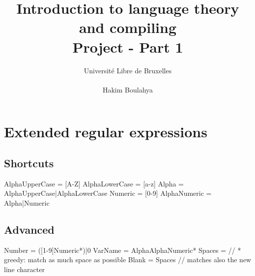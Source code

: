 \documentclass[letterpaper]{article}
\title{Introduction to language theory and compiling
\\ Project - Part 1}
\author{Université Libre de Bruxelles \\
\\ Hakim Boulahya}
\begin{document}
\maketitle

\section{Extended regular expressions}
\subsection{Shortcuts}

AlphaUpperCase = [A-Z]
AlphaLowerCase = [a-z]
Alpha          = {AlphaUpperCase}|{AlphaLowerCase}
Numeric        = [0-9]
AlphaNumeric   = {Alpha}|{Numeric}

\subsection{Advanced}

Number         = ([1-9]{Numeric}*)|0
VarName        = {Alpha}{AlphaNumeric}*
Spaces         = \s* // * greedy: match as much space as possible
Blank          = {Spaces} // \s matches also the new line character
\end{document}
